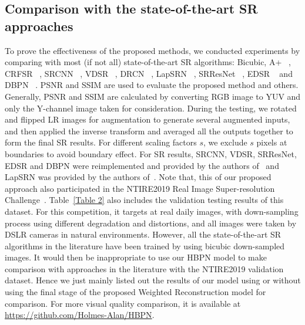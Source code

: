 \documentclass[10pt,twocolumn,letterpaper]{article}
\begin{document}
\subsection{Comparison with the state-of-the-art SR approaches}
To prove the effectiveness of the proposed methods, we conducted experiments by comparing with most (if not all) state-of-the-art SR algorithms: Bicubic, A+ ~\cite{Timofte2015}, CRFSR ~\cite{ICIP18}, SRCNN ~\cite{SRCNN}, VDSR ~\cite{VDSR}, DRCN ~\cite{DRCN}, LapSRN ~\cite{LapSRN}, SRResNet ~\cite{SRGAN}, EDSR ~\cite{EDSR} and DBPN ~\cite{DBPN}. PSNR and SSIM are used to evaluate the proposed method and others. Generally, PSNR and SSIM are calculated by converting RGB image to YUV and only the Y-channel image taken for consideration. During the testing, we rotated and flipped LR images for augmentation to generate several augmented inputs, and then applied the inverse transform and averaged all the outputs together to form the final SR results. For different scaling factors $\mathit{s}$, we exclude $\mathit{s}$ pixels at boundaries to avoid boundary effect. For SR results, SRCNN, VDSR, SRResNet, EDSR and DBPN were reimplemented and provided by the authors of~\cite{DBPN} and LapSRN was provided by the authors of~\cite{LapSRN}. Note that, this of our proposed approach also participated in the NTIRE2019 Real Image Super-resolution Challenge~\cite{NTIRE2019}. Table~\ref{Table 2} also includes the validation testing results of this dataset. For this competition, it targets at real daily images, with down-sampling process using different degradation and distortions, and all images were taken by DSLR cameras in natural environments. However, all the state-of-the-art SR algorithms in the literature have been trained by using bicubic down-sampled images. It would then be inappropriate to use our HBPN model to make comparison with approaches in the literature with the NTIRE2019 validation dataset. Hence we just mainly listed out the results of our model using or without using the final stage of the proposed Weighted Reconstruction model for comparison. For more visual quality comparison, it is available at \url{https://github.com/Holmes-Alan/HBPN}.
\end{document}
